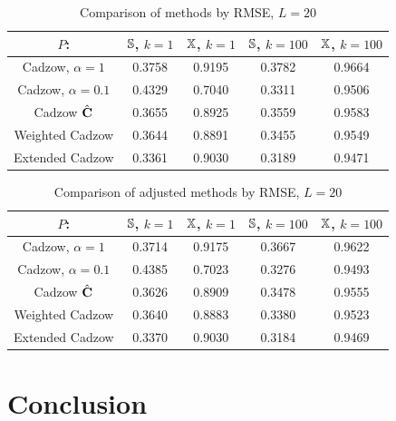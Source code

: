\documentclass[sii]{ipart}
\begin{document}
\begin{table}
		\caption{Comparison of methods by RMSE, $L = 20$}\label{fintable}

		\begin{tabular*}{\textwidth}{@{\extracolsep{\fill}}ccccc}
			\hline
			$P$: & $\mathbb{S}$, $k = 1$ & $\mathbb{X}$, $k = 1$ & $\mathbb{S}$, $k = 100$ & $\mathbb{X}$, $k = 100$  \\
			\hline
			Cadzow, $\alpha = 1$ & 0.3758 & 0.9195 & 0.3782 & 0.9664 \\
			\hline
			Cadzow, $\alpha = 0.1$ & 0.4329 & 0.7040 & 0.3311 & 0.9506 \\
			\hline
			Cadzow $\hat{\mathbf{C}}$ & 0.3655 & 0.8925 & 0.3559 & 0.9583 \\
			\hline
			Weighted Cadzow & 0.3644 & 0.8891 & 0.3455 & 0.9549 \\
			\hline
			Extended Cadzow & 0.3361 & 0.9030 & 0.3189 & 0.9471 \\
			\hline
		\end{tabular*}
\end{table}

\begin{table}
	\begin{center}
		\caption{Comparison of adjusted methods by RMSE, $L = 20$}\label{fintable_improved}
		\begin{tabular*}{\textwidth}{@{\extracolsep{\fill}}ccccc}
			\hline
			$P$: & $\mathbb{S}$, $k = 1$ & $\mathbb{X}$, $k = 1$ & $\mathbb{S}$, $k = 100$ & $\mathbb{X}$, $k = 100$  \\
			\hline
			Cadzow, $\alpha = 1$ & 0.3714 & 0.9175 & 0.3667 & 0.9622 \\
			\hline
			Cadzow, $\alpha = 0.1$ & 0.4385 & 0.7023 & 0.3276 & 0.9493 \\
			\hline
			Cadzow $\hat{\mathbf{C}}$ & 0.3626 & 0.8909 & 0.3478 & 0.9555 \\
			\hline
			Weighted Cadzow & 0.3640 & 0.8883 & 0.3380 & 0.9523 \\
			\hline
			Extended Cadzow & 0.3370 & 0.9030 & 0.3184 & 0.9469 \\
			\hline
		\end{tabular*}
	\end{center}
\end{table}

\section{Conclusion}
\label{sec:concl}
%
%
\end{document}
